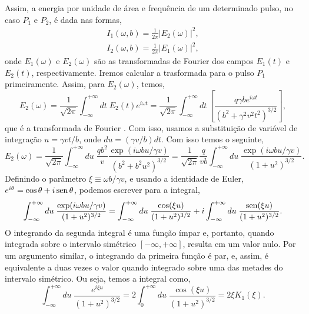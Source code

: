 Assim, a energia por unidade de área e frequência de um determinado
pulso, no caso $P_1$ e $P_2$, é dada nas formas,
\begin{gather}
	I_1(\omega , b) = \frac{1}{2\pi} |E_2 (\omega) |^2 ,\\
	I_2 (\omega , b) = \frac{1}{2\pi} |E_1 (\omega)|^2 ,
\end{gather}
onde $E_1 (\omega)$ e $E_2 (\omega)$ são as transformadas de Fourier dos campos
$E_1(t)$ e $E_2 (t)$, respectivamente. Iremos calcular a trasformada para o
pulso $P_1$ primeiramente. Assim, para $E_2 (\omega)$, temos,
\begin{equation}
	E_2 (\omega) = \frac{1}{\sqrt{2\pi}} \int _{-\infty} ^{+\infty} dt \; E_2 (t)
	e^{i\omega t} = \frac{1}{\sqrt{2\pi}} \int _{-\infty} ^{+\infty} dt \; \left[
		\frac{q \gamma b e^{i\omega t}}{(b^2 + \gamma ^2 v^2 t^2)^{3/2}}
	\right],
\end{equation}
que é a transformada de Fourier \cite{arfken7ed}. Com isso, usamos a
substituição de variável de integração $u = \gamma vt/b$, onde $du = (\gamma
v/b) dt$. Com isso temos o seguinte,
\begin{equation}
	E_2 (\omega) = \frac{1}{\sqrt{2\pi}} \int _{-\infty} ^{+ \infty} du\; \frac{qb^2}{v}
	\frac{\exp (i\omega b u/ \gamma v)}{(b^2 + b^2 u^2)^{3/2}} = \frac{1}{\sqrt{2\pi}}
	\frac{q}{vb} \int _{-\infty}^{+\infty} du \; \frac{\exp (i \omega b u/ \gamma v)}{
		(1+ u^2)^{3/2}}.
\end{equation}
Definindo o parâmetro $\xi \equiv \omega b / \gamma v$, e usando a identidade
de Euler, $e ^{i\theta} = \cos \theta + i \operatorname*{sen} \theta$, podemos escrever para a
integral,
\begin{equation}
	\int _{-\infty} ^{+\infty} du\; \frac{\exp (i \omega b u/ \gamma v)}{ (1+
	u^2)^{3/2}} = \int _{-\infty} ^{+\infty} du \; \frac{\cos (\xi u)}{(1 + u^2 )^{3/2}}
	+ i \int _{-\infty} ^{+\infty} du \; \frac{\operatorname*{sen}(\xi u)}{(1 + u^2)^{3/2}}.
\end{equation}
O integrando da segunda integral é uma função ímpar e, portanto, quando
integrada sobre o intervalo simétrico $[-\infty , + \infty]$, resulta em 
um valor nulo. Por um argumento similar, o integrando da primeira função
é par, e, assim, é equivalente a duas vezes o valor quando integrado sobre
uma das metades do intervalo simétrico. Ou seja, temos a integral como,
\begin{equation}
	\int _{-\infty} ^{+\infty} du\; \frac{e^{i \xi u}}{(1+u^2)^{3/2}} = 2 \int
	_0 ^{+\infty} du \; \frac{\cos (\xi u )}{(1 + u^2)^{3/2}} = 2 \xi K_1 (\xi).
\end{equation}
